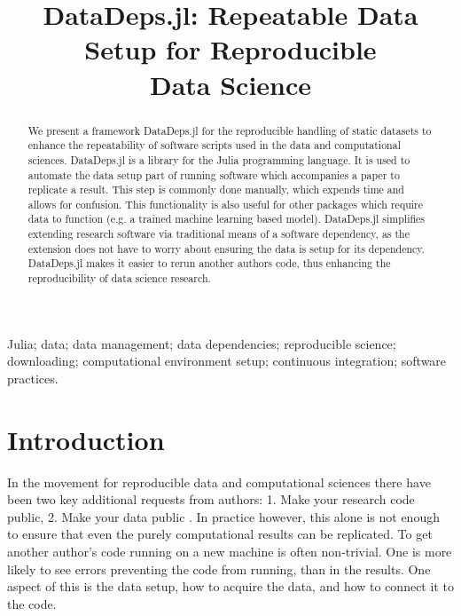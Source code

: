 \documentclass[twoside,11pt]{article}\usepackage{jmlr2e}
\begin{document}
\title{DataDeps.jl: Repeatable Data Setup for Reproducible\\ Data Science}
\author{
}
\editor{}


\maketitle

\begin{abstract}
	We present a framework DataDeps.jl for the reproducible handling of static datasets to enhance the repeatability of software scripts used in the data and computational sciences.
	DataDeps.jl is a library for the Julia programming language.
	It is used to automate the data setup part of running software which accompanies a paper to replicate a result.
	This step is commonly done manually, which expends time and allows for confusion.
	This functionality is also useful for other packages which require data to function (e.g. a trained machine learning based model).
	DataDeps.jl simplifies extending research software via traditional means of a software dependency, as the extension does not have to worry about ensuring the data is setup for its dependency.
	DataDeps.jl makes it easier to rerun another authors code, thus enhancing the reproducibility of data science research.
\end{abstract}

\begin{keywords}
Julia; data; data management;  data dependencies; reproducible science; downloading; computational environment setup; continuous integration; software practices.
\end{keywords}

\section{Introduction}

In the movement for reproducible data and computational sciences there have been two key additional requests from authors:
1. Make your research code public, 2. Make your data public \citep{lookafterdata}.
In practice however, this alone is not enough to ensure that even the purely computational results can be replicated.
To get another author's code running on a new machine is often non-trivial.
One is more likely to see errors preventing the code from running, than in the results.
One aspect of this is the data setup, how to acquire the data, and how to connect it to the code.
\end{document}
